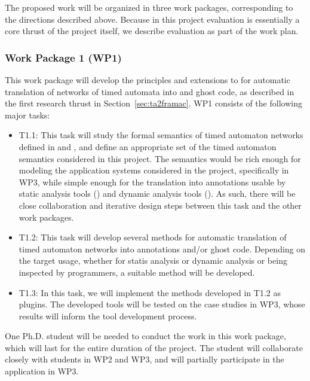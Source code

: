 The proposed work will be organized in three work packages,
corresponding to the directions described above.  Because in this
project evaluation is essentially a core thrust of the project itself,
we describe evaluation as part of the work plan.

\subsubsection{Work Package 1 (WP1)}

This work package will develop the principles and extensions to \framac for automatic translation of networks of timed automata into \acsl and ghost code, as described in the first research thrust in Section~\ref{sec:ta2framac}.
WP1 consists of the following major tasks:
\begin{itemize}[labelsep=3pt,leftmargin=12pt]

\item T1.1: This task will study the formal semantics of timed automaton networks defined in \uppaal and \prism, and define an appropriate set of the timed automaton semantics considered in this project.  The semantics would be rich enough for modeling the application systems considered in the project, specifically in WP3, while simple enough for the translation into annotations usable by static analysis tools (\framac) and dynamic analysis tools (\deepstate).  As such, there will be close collaboration and iterative design steps between this task and the other work packages. %

\item T1.2: This task will develop several methods for automatic translation of timed automaton networks into \acsl annotations and/or ghost code.  Depending on the target usage, whether for statis analysis or dynamic analysis or being inspected by programmers, a suitable method will be developed.

\item T1.3: In this task, we will implement the methods developed in T1.2 as \framac plugins.  The developed tools will be tested on the case studies %
  in WP3, whose results will inform the tool development process.
\end{itemize}

One Ph.D. student will be needed to conduct the work in this work package, which will last for the entire duration of the project.
The student will collaborate closely with students in WP2 and WP3, and
will partially participate in the application in WP3.

